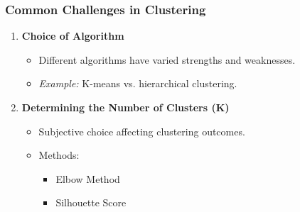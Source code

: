 \documentclass{beamer}
\begin{document}
\begin{frame}[fragile]
    \frametitle{Common Challenges in Clustering}
    \begin{enumerate}
        \item \textbf{Choice of Algorithm}
            \begin{itemize}
                \item Different algorithms have varied strengths and weaknesses.
                \item \textit{Example:} K-means vs. hierarchical clustering.
            \end{itemize}
        
        \item \textbf{Determining the Number of Clusters (K)}
            \begin{itemize}
                \item Subjective choice affecting clustering outcomes.
                \item Methods:
                    \begin{itemize}
                        \item Elbow Method
                        \item Silhouette Score
                    \end{itemize}
            \end{itemize}
    \end{enumerate}
\end{frame}
\end{document}
